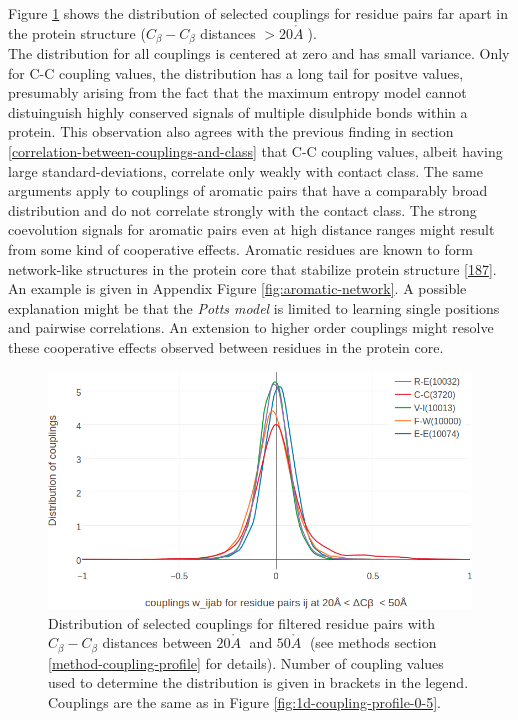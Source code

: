 \documentclass[11pt,a4paper,twoside]{book}
\newcommand{\Cb}{C_\beta}
\newcommand{\angstrom}{\mathring{A} \;}
\theoremstyle{definition}
\theoremstyle{definition}
\theoremstyle{remark}
\begin{document}
Figure \ref{fig:1d-coupling-profile-20-50} shows the distribution of
selected couplings for residue pairs far apart in the protein structure
(\(\Cb-\Cb\) distances \(> 20\angstrom\)).\\
The distribution for all couplings is centered at zero and has small
variance. Only for C-C coupling values, the distribution has a long tail
for positve values, presumably arising from the fact that the maximum
entropy model cannot distuinguish highly conserved signals of multiple
disulphide bonds within a protein. This observation also agrees with the
previous finding in section
\ref{correlation-between-couplings-and-class} that C-C coupling values,
albeit having large standard-deviations, correlate only weakly with
contact class. The same arguments apply to couplings of aromatic pairs
that have a comparably broad distribution and do not correlate strongly
with the contact class. The strong coevolution signals for aromatic
pairs even at high distance ranges might result from some kind of
cooperative effects. Aromatic residues are known to form network-like
structures in the protein core that stabilize protein structure
{[}\protect\hyperlink{ref-Burley1985}{187}{]}. An example is given in
Appendix Figure \ref{fig:aromatic-network}. A possible explanation might
be that the \emph{Potts model} is limited to learning single positions
and pairwise correlations. An extension to higher order couplings might
resolve these cooperative effects observed between residues in the
protein core.








\begin{figure}
\includegraphics[width=1\linewidth]{img/coupling_matrix_analysis/1d_coupling_profile_20_50} \caption{Distribution of selected
couplings for filtered residue pairs with \(\Cb-\Cb\) distances between
\(20\angstrom\) and \(50\angstrom\) (see methods section
\ref{method-coupling-profile} for details). Number of coupling values
used to determine the distribution is given in brackets in the legend.
Couplings are the same as in Figure \ref{fig:1d-coupling-profile-0-5}.}\label{fig:1d-coupling-profile-20-50}
\end{figure}
\end{document}
